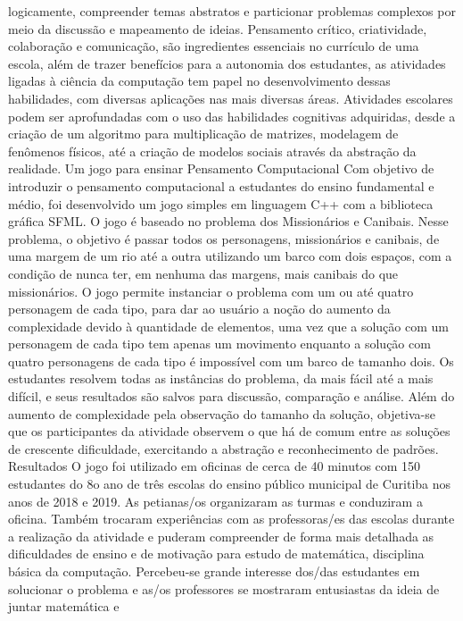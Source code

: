 logicamente, compreender temas abstratos e particionar problemas complexos por meio da
discussão e mapeamento de ideias.
Pensamento crítico, criatividade, colaboração e comunicação, são ingredientes essenciais
no currículo de uma escola, além de trazer benefícios para a autonomia dos estudantes, as
atividades ligadas à ciência da computação tem papel no desenvolvimento dessas habilidades,
com diversas aplicações nas mais diversas áreas. Atividades escolares podem ser aprofundadas
com o uso das habilidades cognitivas adquiridas, desde a criação de um algoritmo para
multiplicação de matrizes, modelagem de fenômenos físicos, até a criação de modelos sociais
através da abstração da realidade.
Um jogo para ensinar Pensamento Computacional
Com objetivo de introduzir o pensamento computacional a estudantes do ensino
fundamental e médio, foi desenvolvido um jogo simples em linguagem C++ com a biblioteca
gráfica SFML. O jogo é baseado no problema dos Missionários e Canibais. Nesse problema, o
objetivo é passar todos os personagens, missionários e canibais, de uma margem de um rio até a
outra utilizando um barco com dois espaços, com a condição de nunca ter, em nenhuma das
margens, mais canibais do que missionários. O jogo permite instanciar o problema com um ou
até quatro personagem de cada tipo, para dar ao usuário a noção do aumento da complexidade
devido à quantidade de elementos, uma vez que a solução com um personagem de cada tipo tem
apenas um movimento enquanto a solução com quatro personagens de cada tipo é impossível
com um barco de tamanho dois. Os estudantes resolvem todas as instâncias do problema, da mais
fácil até a mais difícil, e seus resultados são salvos para discussão, comparação e análise. Além
do aumento de complexidade pela observação do tamanho da solução, objetiva-se que os
participantes da atividade observem o que há de comum entre as soluções de crescente
dificuldade, exercitando a abstração e reconhecimento de padrões.
Resultados
O jogo foi utilizado em oficinas de cerca de 40 minutos com 150 estudantes do 8o ano de
três escolas do ensino público municipal de Curitiba nos anos de 2018 e 2019. As petianas/os
organizaram as turmas e conduziram a oficina. Também trocaram experiências com as
professoras/es das escolas durante a realização da atividade e puderam compreender de forma
mais detalhada as dificuldades de ensino e de motivação para estudo de matemática, disciplina
básica da computação. Percebeu-se grande interesse dos/das estudantes em solucionar o
problema e as/os professores se mostraram entusiastas da ideia de juntar matemática e
